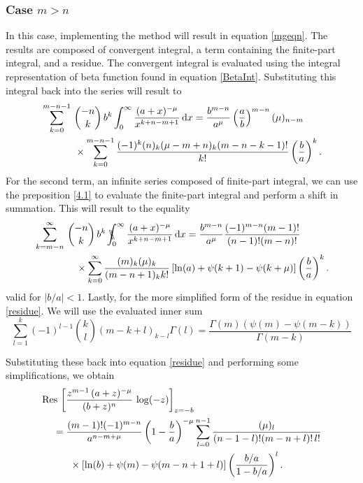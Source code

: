 \subsubsection{Case $m > n$}In this case, implementing the method will result in equation \eqref{mgeqn}. The results are composed of convergent integral, a term containing the finite-part integral, and a residue. The convergent integral is evaluated using the integral representation of beta function found in equation \eqref{BetaInt}. Substituting this integral back into the series will result to
\begin{equation}
\begin{split} \label{CI5.3}
&\sum_{k=0}^{m-n-1} \, {- n \choose k} \, b^{k}   \int_0^{\infty} \frac{(a+x)^{-\mu}}{x^{k+n-m+1}} \,\mathrm{d}x = \frac{b^{m-n}}{a^{\mu}} \left(\frac{a}{b}\right)^{m-n} (\mu)_{n-m}\\
&\hspace{12mm}\times\sum_{k=0}^{m-n-1} \frac{(-1)^k 
	(n)_k (\mu-m+n)_k (m-n-k-1)!}{k!} \left(\frac{b}{a}\right)^k.
 \end{split}
\end{equation} 
For the second term, an infinite series composed of finite-part integral, we can  use the preposition \ref{4.1} to evaluate the finite-part integral and perform a shift in summation. This will result to the equality
\begin{equation} \label{SFS}
	\begin{split}
	&\sum_{k=m-n}^{\infty} \, {- n \choose k} \, b^{k} \,\bbint{0}{\infty} \frac{(a+x)^{-\mu}}{x^{k+n-m+1}} \,\mathrm{d}x = \frac{b^{m-n}}{a^{\mu} }\frac{(-1)^{m-n} (m-1)!}{(n-1)! (m-n)!}\\ &\hspace{15mm}\times\sum_{k=0}^{\infty} \frac{(m)_k (\mu)_k}{(m-n+1)_k k!} \left[\ln(a)+\psi(k+1)-\psi(k+\mu)\right]\left(\frac{b}{a}\right)^k .
	\end{split}
\end{equation}
valid for $|b/a| < 1$. Lastly, for the more simplified form of the residue in equation \eqref{residue}. We will use the evaluated inner sum
\begin{equation} \label{4.22}
\sum_{l=1}^{k} (-1)^{l-1} {k \choose l} (m-k+l)_{k-l} \Gamma(l)=\frac{\Gamma (m) (\psi(m)-\psi(m-k))}{\Gamma (m-k)}
\end{equation}

Substituting these back into equation \eqref{residue} and performing some simplifications, we obtain
\begin{equation}
\begin{split}
   & \mathrm{Res} \, \left[\frac{z^{m-1} \, (a+z)^{-\mu}}{(b+z)^{n}}\, \log(-z) \right]_{z=-b} 
   \\&\hspace{4mm}= \frac{(m-1)!  (-1)^{m-n}}{a^{n-m+\mu}} \left(1-\frac{b}{a}\right)^{-\mu} 
   \sum_{l=0}^{n-1} \frac{(\mu)_l}{(n-1-l)! (m-n+l)! \,l!}  \\&\hspace{10mm}\times \left[\ln(b)+\psi(m)-\psi(m-n+1+l)\right]\left(\frac{b/a}{1-b/a}\right)^l.
    \end{split}
\end{equation}

